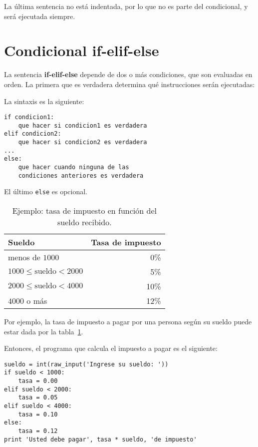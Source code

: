 La última sentencia no está indentada, por lo que no es parte del
condicional, y será ejecutada siempre.

\section{Condicional if-elif-else}

La sentencia \textbf{if-elif-else} depende de dos o más condiciones, que
son evaluadas en orden. La primera que es verdadera determina qué
instrucciones serán ejecutadas:

\begin{center}
  
\end{center}

La sintaxis es la siguiente:

\begin{lstlisting}
if condicion1:
    que hacer si condicion1 es verdadera
elif condicion2:
    que hacer si condicion2 es verdadera
...
else:
    que hacer cuando ninguna de las
    condiciones anteriores es verdadera
\end{lstlisting}

El último \lstinline!else! es opcional.

\begin{table}
  \centering
  \begin{tabular}{lr}
    \toprule
      Sueldo & Tasa de impuesto \\
    \midrule
      menos de \(1000\)                 &  0\% \\
      \(1000 \le \text{sueldo} < 2000\) &  5\% \\
      \(2000 \le \text{sueldo} < 4000\) & 10\% \\
      \(4000\) o más                    & 12\% \\
    \bottomrule
  \end{tabular}
  \caption{Ejemplo: tasa de impuesto en función del sueldo recibido.}
  \label{tbl:tasa-impuesto}
\end{table}

Por ejemplo, la tasa de impuesto a pagar por una persona según su sueldo
puede estar dada por la tabla~\ref{tbl:tasa-impuesto}.

Entonces, el programa que calcula el impuesto a pagar es el siguiente:

\begin{lstlisting}
sueldo = int(raw_input('Ingrese su sueldo: '))
if sueldo < 1000:
    tasa = 0.00
elif sueldo < 2000:
    tasa = 0.05
elif sueldo < 4000:
    tasa = 0.10
else:
    tasa = 0.12
print 'Usted debe pagar', tasa * sueldo, 'de impuesto'
\end{lstlisting}


